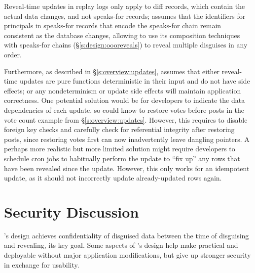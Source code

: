 %
Reveal-time updates in replay logs only apply to diff records, which contain the actual
data changes, and not speaks-for records; \sys assumes that the identifiers for
principals in speaks-for records that encode the speaks-for chain remain
consistent as the database changes, allowing \sys to use its composition
techniques with speaks-for chains (\S\ref{s:design:oooreveals}) to reveal
multiple disguises in any order.
%

%
Furthermore, as described in \S\ref{s:overview:updates}, \sys assumes that
either \one{} reveal-time updates are pure functions deterministic in their input and do not
have side effects; or \two{} any nondeterminism or update side effects will
maintain application correctness.
%
One potential solution would be for developers to indicate the data dependencies
of each update, so \sys could know to \eg restore votes before posts in the
vote count example from \S\ref{s:overview:updates}. However, this
requires \sys to disable foreign key checks and carefully check for referential
integrity after restoring posts, since restoring votes first can now
inadvertently leave dangling pointers. 
%
A perhaps more realistic but more limited solution might require developers to
schedule cron jobs to habitually perform the update to ``fix up'' any rows that
have been revealed since the update. However, this only works for an idempotent
update, as it should not incorrectly update already-updated rows again.  
%


\section{Security Discussion}
\label{s:eval-security}

%
%
\sys's design achieves confidentiality of disguised data between the time of
disguising and revealing, its key goal.
%
Some aspects of \sys's design help make \sys practical and deployable without
major application modifications, but give up stronger security in exchange for
usability.
%

